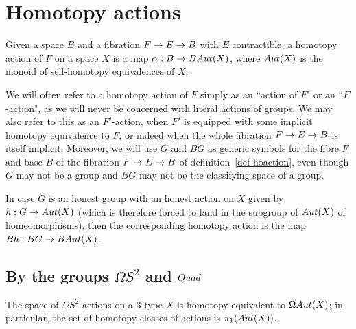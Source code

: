 \documentclass{amsart}
\begin{document}

\section{Homotopy actions}


\begin{definition} \label{def-hoaction}
Given a space $B$ and a fibration $F \rightarrow E \rightarrow B$ with $E$ contractible, a homotopy action of $F$ on a space $X$ is a map $\alpha: B \rightarrow BAut(X)$, where $Aut(X)$ is the monoid of self-homotopy equivalences of $X$.
\end{definition}
\nid We will often refer to a homotopy action of $F$ simply as an ``action of $F$" or an ``$F$-action", as we will never be concerned with literal actions of groups.  We may also refer to this as an $F'$-action, when $F'$ is equipped with some implicit homotopy equivalence to $F$, or indeed when the whole fibration $F \rightarrow E \rightarrow B$ is itself implicit.  Moreover, we will use $G$ and $BG$ as generic symbols for the fibre $F$ and base $B$ of the fibration $F \rightarrow E \rightarrow B$ of definition~\ref{def-hoaction}, even though $G$ may not be a group and $BG$ may not be the classifying space of a group.

In case $G$ is an honest group with an honest action on $X$ given by $h: G \rightarrow Aut(X)$ (which is therefore forced to land in the subgroup of $Aut(X)$ of homeomorphisms), then the corresponding homotopy action is the map $Bh: BG \rightarrow BAut(X)$.


\subsection{By the groups $\Omega S^2$ and $Quad$} \label{sec-quadaction}

\begin{proposition}
The space of $\Omega S^2$ actions on a 3-type $X$ is homotopy equivalent to $\Omega Aut(X)$; in particular, the set of homotopy classes of actions is $\pi_1(Aut(X))$.
\end{proposition}
\end{document}
